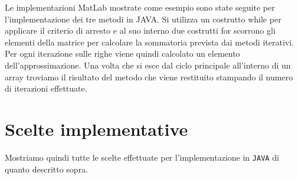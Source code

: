 \documentclass[12pt]{article}
\begin{document}
Le implementazioni MatLab mostrate come esempio sono state seguite per l'implementazione dei tre metodi in JAVA. Si utilizza un costrutto while per applicare il criterio di arresto e al suo interno due costrutti for scorrono gli elementi della matrice per calcolare la sommatoria prevista dai metodi iterativi. Per ogni iterazione sulle righe viene quindi calcolato un elemento dell'approssimazione. Una volta che si esce dal ciclo principale all'interno di un array troviamo il risultato del metodo che viene restituito stampando il numero di iterazioni effettuate.

\section{Scelte implementative}
Mostriamo quindi tutte le scelte effettuate per l'implementazione in \texttt{JAVA} di quanto descritto sopra. \\
\end{document}
